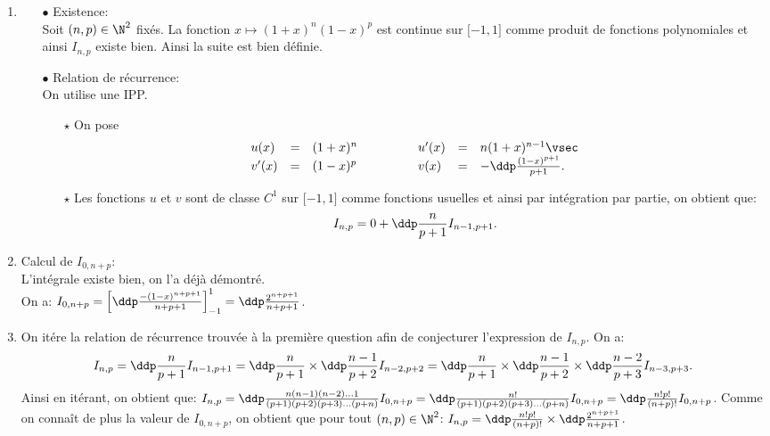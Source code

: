 \documentclass[a4paper, 11pt,reqno]{article}
\begin{document}
\begin{correction}
	\begin{enumerate}
		\item
		      \begin{itemize}
			      \item[$\bullet$] Existence:\\
			            \noindent Soit $(n,p)\in\N^{2}$ fix\'es. La fonction $x\mapsto (1+x)^n(1-x)^p$ est continue sur $\lbrack -1,1\rbrack$ comme produit de fonctions polynomiales et ainsi $I_{n,p}$ existe bien. Ainsi la suite est bien d\'efinie.
			      \item[$\bullet$] Relation de r\'ecurrence:\\
			            \noindent On utilise une IPP.
			            \begin{itemize}
				            \item[$\star$] On pose
				                  $$\begin{array}{lllllll}
						                  u(x)          & = & (1+x)^n & \hspace{1cm} & u^{\prime}(x) & = & n(1+x)^{n-1}\vsec             \\
						                  v^{\prime}(x) & = & (1-x)^p & \hspace{1cm} & v(x)          & = & -\ddp\frac{(1-x)^{p+1}}{p+1}.
					                  \end{array}$$
				            \item[$\star$] Les fonctions $u$ et $v$ sont de classe $C^1$ sur $\lbrack -1,1\rbrack$ comme fonctions usuelles et ainsi par int\'egration par partie, on obtient que:
				                  $$I_{n,p}=0+\ddp\frac{n}{p+1}I_{n-1,p+1}.$$
			            \end{itemize}
		      \end{itemize}
		\item Calcul de $I_{0,n+p}$:\\
		      \noindent L'int\'egrale existe bien, on l'a d\'ej\`{a} d\'emontr\'e.\\
		      \noindent On a: $I_{0,n+p}=\left\lbrack \ddp\frac{-(1-x)^{n+p+1}}{n+p+1} \right\rbrack_{-1}^1=\ddp\frac{2^{n+p+1}}{n+p+1}$.
		\item On it\'ere la relation de r\'ecurrence trouv\'ee \`{a} la premi\`{e}re question afin de conjecturer l'expression de $I_{n,p}$. On a:
		      $$I_{n,p}=\ddp\frac{n}{p+1}I_{n-1,p+1}=\ddp\frac{n}{p+1}\times \ddp\frac{n-1}{p+2} I_{n-2,p+2}=\ddp\frac{n}{p+1}\times \ddp\frac{n-1}{p+2} \times \ddp\frac{n-2}{p+3} I_{n-3,p+3}.$$
		      Ainsi en it\'erant, on obtient que: $I_{n,p}=\ddp\frac{n(n-1)(n-2)\dots  1}{(p+1)(p+2)(p+3)\dots (p+n)} I_{0,n+p}=\ddp\frac{n!}{(p+1)(p+2)(p+3)\dots (p+n)}I_{0,n+p}=\ddp\frac{n! p!}{(n+p)!}I_{0,n+p}$. Comme on conna\^{i}t de plus la valeur de $I_{0,n+p}$, on obtient que pour tout $(n,p)\in\N^2$: $I_{n,p}=\ddp\frac{n! p!}{(n+p)!} \times \ddp\frac{2^{n+p+1}}{n+p+1}$.
	\end{enumerate}
\end{correction}
\end{document}
